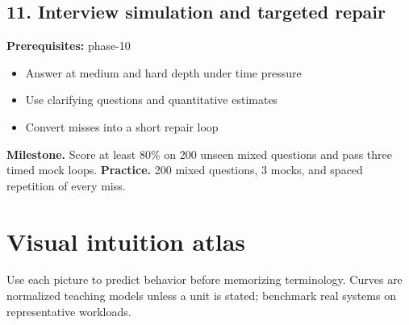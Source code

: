 \subsection{11. Interview simulation and targeted repair}
 \quad \textbf{Prerequisites:} phase-10
\begin{itemize}
\item Answer at medium and hard depth under time pressure
\item Use clarifying questions and quantitative estimates
\item Convert misses into a short repair loop
\end{itemize}
\textbf{Milestone.} Score at least 80\% on 200 unseen mixed questions and pass three timed mock loops.
\textbf{Practice.} 200 mixed questions, 3 mocks, and spaced repetition of every miss.
\clearpage\section{Visual intuition atlas}
Use each picture to predict behavior before memorizing terminology. Curves are normalized teaching models unless a unit is stated; benchmark real systems on representative workloads.
